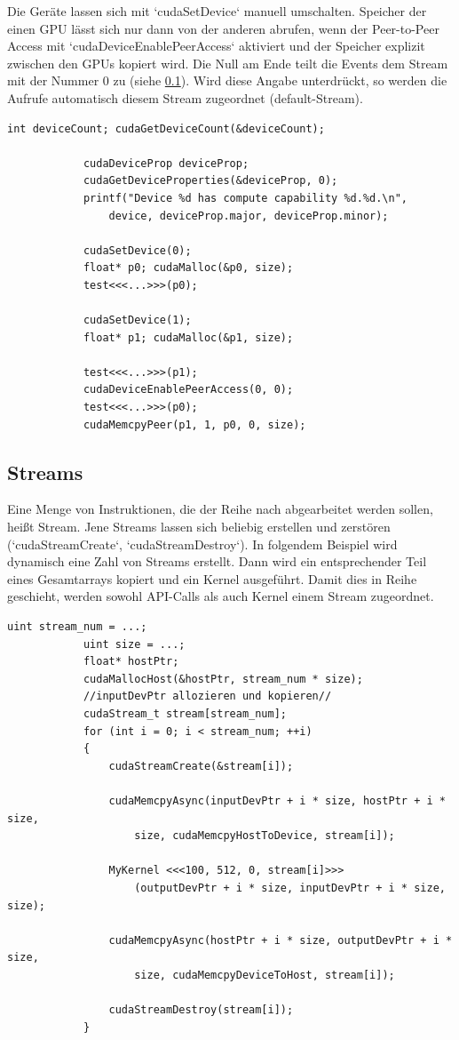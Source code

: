 		Die Geräte lassen sich mit \li`cudaSetDevice` manuell umschalten. Speicher der einen GPU lässt sich nur dann von der anderen abrufen, wenn der Peer-to-Peer Access mit \li`cudaDeviceEnablePeerAccess` aktiviert und der Speicher explizit zwischen den GPUs kopiert wird. Die Null am Ende teilt die Events dem Stream mit der Nummer 0 zu (siehe \ref{streams}). Wird diese Angabe unterdrückt, so werden die Aufrufe automatisch diesem \Gls{Stream} zugeordnet (default-\Gls{Stream}).
		\begin{lstlisting}[caption=Device Peer-to-Peer Access]
			int deviceCount; cudaGetDeviceCount(&deviceCount);

			cudaDeviceProp deviceProp;
			cudaGetDeviceProperties(&deviceProp, 0);
			printf("Device %d has compute capability %d.%d.\n",
    			device, deviceProp.major, deviceProp.minor);
           
			cudaSetDevice(0);
			float* p0; cudaMalloc(&p0, size);
			test<<<...>>>(p0);
			
			cudaSetDevice(1);
			float* p1; cudaMalloc(&p1, size);
			
			test<<<...>>>(p1);
			cudaDeviceEnablePeerAccess(0, 0);
			test<<<...>>>(p0);
			cudaMemcpyPeer(p1, 1, p0, 0, size);
		\end{lstlisting}

	
		\subsection{Streams}\label{streams}
		Eine Menge von Instruktionen, die der Reihe nach abgearbeitet werden sollen, heißt \Gls{Stream}. Jene \Glspl{Stream} lassen sich beliebig erstellen und zerstören (\li`cudaStreamCreate`, \li`cudaStreamDestroy`). In folgendem Beispiel wird dynamisch eine Zahl von \Glspl{Stream} erstellt. Dann wird ein entsprechender Teil eines Gesamtarrays kopiert und ein Kernel ausgeführt. Damit dies in Reihe geschieht, werden sowohl \Gls{API}-Calls als auch \Gls{Kernel} einem \Gls{Stream} zugeordnet.	
		
		\begin{lstlisting}[caption=Streams]
			uint stream_num = ...;
			uint size = ...;	    
			float* hostPtr;
			cudaMallocHost(&hostPtr, stream_num * size);	
			//inputDevPtr allozieren und kopieren//
			cudaStream_t stream[stream_num];
			for (int i = 0; i < stream_num; ++i)
			{
				cudaStreamCreate(&stream[i]);
    			
				cudaMemcpyAsync(inputDevPtr + i * size, hostPtr + i * size,
					size, cudaMemcpyHostToDevice, stream[i]);
    			
				MyKernel <<<100, 512, 0, stream[i]>>>
					(outputDevPtr + i * size, inputDevPtr + i * size, size);
				
				cudaMemcpyAsync(hostPtr + i * size, outputDevPtr + i * size,
					size, cudaMemcpyDeviceToHost, stream[i]);
								
				cudaStreamDestroy(stream[i]);
			}
		\end{lstlisting}

